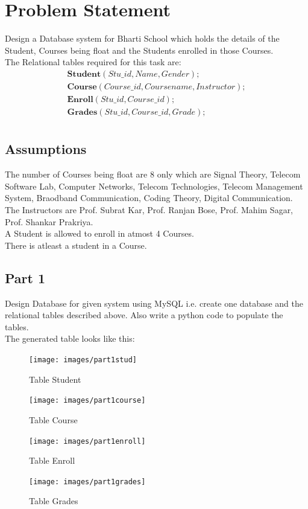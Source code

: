 \documentclass[11pt]{report}
\begin{document}
\section{Problem Statement}
Design a Database system for Bharti School which holds the details of the Student, Courses being float and the Students enrolled in those Courses.\\
The Relational tables required for this task are:\\
\begin{gather*}
\textbf{Student}(Stu\_id, Name, Gender);\\
\textbf{Course}(Course\_id, Course name, Instructor);\\
\textbf{Enroll}(Stu\_id, Course\_id);\\
\textbf{Grades}(Stu\_id, Course\_id, Grade);\\
\end{gather*}
	
\subsection{Assumptions}
The number of Courses being float are 8 only which are Signal Theory, Telecom Software Lab, Computer Networks, Telecom Technologies, Telecom Management System, Braodband Communication, Coding Theory, Digital Communication. \\
The Instructors are Prof. Subrat Kar, Prof. Ranjan Bose, Prof. Mahim Sagar, Prof. Shankar Prakriya.\\
A Student is allowed to enroll in atmost 4 Courses.\\
There is atleast a student in a Course.
\subsection{Part 1}
Design Database for given system using MySQL i.e. create one database and the relational tables described above. Also write a python code to populate the tables.\\
The generated table looks like this:\\
\begin{figure}[h!]
\centering
\texttt{[image: images/part1stud]}
\caption{Table Student}	
\end{figure}
\pagebreak
\begin{figure}[h!]
\centering
\texttt{[image: images/part1course]}
\caption{Table Course}	
\end{figure}
\pagebreak
\begin{figure}[h!]
\centering
\texttt{[image: images/part1enroll]}
\caption{Table Enroll}	
\end{figure}
\pagebreak
\begin{figure}[h!]
\centering
\texttt{[image: images/part1grades]}
\caption{Table Grades}	
\end{figure}
\pagebreak
\end{document}
